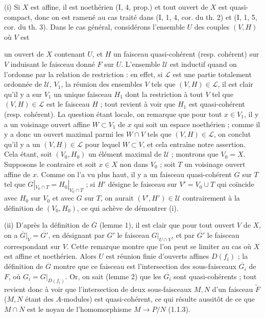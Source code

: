 (i) Si $X$ est affine, il est noethérien (I, 4, prop.) et tout ouvert de $X$ est quasi-compact, donc on est ramené au cas traité dans (I, 1, 4, cor. du th. 2) et (I, 1, 5, cor. du th. 3). Dans le cas général, considérons l'ensemble $U$ des couples $(V, H)$ où $V$ est

\newpage


un ouvert de $X$ contenant $U$, et $H$ un faisceau quasi-cohérent (resp. cohérent) sur $V$ induisant le faisceau donné $F$ sur $U$. L'ensemble $\mathcal{U}$ est inductif quand on l'ordonne par la relation de restriction : en effet, si $\mathcal{L}$ est une partie totalement ordonnée de $\mathcal{U}$, $V_1$, la réunion des ensembles $V$ tels que $(V, H) \in \mathcal{L}$, il est clair qu'il y a sur $V_1$ un unique faisceau $H_1$ dont la restriction à tout $V$ tel que $(V, H) \in \mathcal{L}$ est le faisceau $H$ ; tout revient à voir que $H_1$ est quasi-cohérent (resp. cohérent). La question étant locale, on remarque que pour tout $x \in V_1$, il y a un voisinage ouvert affine $W \subset V_1$ de $x$ qui soit un espace noethérien ; comme il y a donc un ouvert maximal parmi les $W \cap V$ tels que $(V, H) \in \mathcal{L}$, on conclut qu'il y a un $(V, H) \in \mathcal{L}$ pour lequel $W \subset V$, et cela entraîne notre assertion. Cela étant, soit $(V_0, H_0)$ un élément maximal de $\mathcal{U}$ ; montrons que $V_0 = X$. Supposons le contraire et soit $x \in X$ non dans $V_0$ ; soit $T$ un voisinage ouvert affine de $x$. Comme on l'a vu plus haut, il y a un faisceau quasi-cohérent $G$ sur $T$ tel que $G|_{V_0 \cap T} = H_0|_{V_0 \cap T}$ ; si $H'$ désigne le faisceau sur $V' = V_0 \cup T$ qui coïncide avec $H_0$ sur $V_0$ et avec $G$ sur $T$, on aurait $(V', H') \in \mathcal{U}$ contrairement à la définition de $(V_0, H_0)$, ce qui achève de démontrer (i).

(ii) D'après la définition de $\overline{G}$ (lemme 1), il est clair que pour tout ouvert $V$ de $X$, on a $\overline{G}|_V = \overline{G'}$, en désignant par $G'$ le faisceau $G|_{U \cap V}$, et par $\overline{G'}$ le faisceau correspondant sur $V$. Cette remarque montre que l'on peut se limiter au cas où $X$ est affine et noethérien. Alors $U$ est réunion finie d'ouverts affines $D(f_i)$ ; la définition de $\overline{G}$ montre que ce faisceau est l'intersection des sous-faisceaux $\overline{G_i}$ de $F$, où $G_i = G|_{D(f_i)}$. Or, on sait (lemme 2) que les $\overline{G_i}$ sont quasi-cohérents ; tout revient donc à voir que l'intersection de deux sous-faisceaux $M, N$ d'un faisceau $\tilde{F}$ ($M, N$ étant des $A$-modules) est quasi-cohérent, ce qui résulte aussitôt de ce que $M \cap N$ est le noyau de l'homomorphisme $M \to P/N$ (1.1.3).

